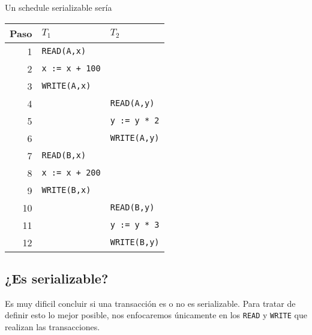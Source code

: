 {\begin{center}
  \end{center}
  Un schedule serializable sería
  \begin{center}
    \begin{tabular}{r|ll}
      Paso  & \textbf{$T_1$}          & \textbf{$T_2$}          \\\hline
      1     & \texttt{READ(A,x)}      &                         \\
      2     & \texttt{x := x + 100}   &                         \\
      3     & \texttt{WRITE(A,x)}     &                         \\
      4     &                         & \texttt{READ(A,y)}      \\
      5     &                         & \texttt{y := y * 2}     \\
      6     &                         & \texttt{WRITE(A,y)}     \\
      7     & \texttt{READ(B,x)}      &                         \\
      8     & \texttt{x := x + 200}   &                         \\
      9     & \texttt{WRITE(B,x)}     &                         \\
      10    &                         & \texttt{READ(B,y)}      \\
      11    &                         & \texttt{y := y * 3}     \\
      12    &                         & \texttt{WRITE(B,y)}     \\
    \end{tabular}
  \end{center}
}


\subsection{¿Es serializable?}
Es muy dificil concluir si una transacción es o no es serializable. Para tratar de definir esto lo mejor posible, nos enfocaremos únicamente en los \texttt{READ} y \texttt{WRITE} que realizan las transacciones.


